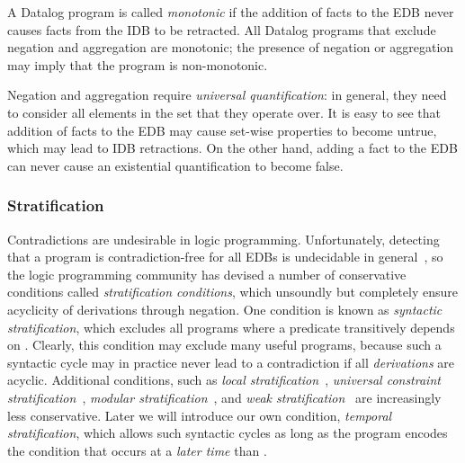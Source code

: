 A Datalog program is called {\em monotonic} if the addition of
facts to the EDB never causes facts from the IDB to be retracted.  All Datalog
programs that exclude negation and aggregation are monotonic; the presence of
negation or aggregation may imply that the program is non-monotonic.

Negation and aggregation require {\em universal
quantification}:
in general, they need to consider all elements in the
set that they operate over.  It is easy to see that addition of facts to the
EDB may cause set-wise properties to become untrue, which may lead to IDB
retractions.  On the other hand, adding a fact to the EDB can never cause an
existential quantification to become false.

\subsubsection{Stratification}

Contradictions are undesirable in logic programming. 
Unfortunately, detecting that a program is contradiction-free for all EDBs is
undecidable in general~\cite{papa-yanna}, so the logic programming community
has devised a number of conservative conditions called {\em stratification
conditions}, which unsoundly but completely ensure acyclicity of derivations
through negation.  One condition is known as {\em syntactic stratification},
which excludes all programs where a predicate  transitively depends
on .  Clearly, this condition may exclude many useful
programs, because such a syntactic cycle may in practice never lead to a
contradiction if all {\em derivations} are acyclic.  Additional conditions,
such as {\em local stratification}~\cite{local-strat}, {\em universal
constraint stratification}~\cite{ross-syntactic}, {\em modular
stratification}~\cite{modular}, and {\em weak stratification}~\cite{weak-strat}
are increasingly less conservative.  Later we will introduce our own condition,
{\em temporal stratification}, which allows such syntactic cycles as long as
the program encodes the condition that  occurs at a {\em later time}
than .

